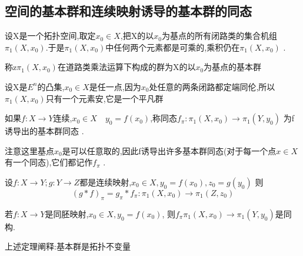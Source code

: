 \subsection*{空间的基本群和连续映射诱导的基本群的同态}
设X是一个拓扑空间,取定\(x_0 \in X \),把X的以\(x_0\)为基点的所有闭路类的集合机组\(\pi_1(X ,x_0)\).于是\(\pi_1(X,x_0)\)中任何两个元素都是可乘的,乘积仍在\(\pi_1(X,x_0)\) . 
\begin{definition}
    称z\(\pi_1(X,x_0)\)在道路类乘法运算下构成的群为X的以\(x_0\)为基点的基本群
\end{definition}
\begin{example}
    设X是\(E^n\)的凸集,\(x_0 \in X \)是任一点,因为\(x_0\)处任意的两条闭路都定端同伦,所以\(\pi_1(X,x_0)\)只有一个元素安,它是一个平凡群
\end{example}
\begin{definition}
    如果\(f: X \rightarrow Y \)连续,\(x_0 \in X  \quad y_0 =f(x_0)\),称同态\(f_{\pi} :  \pi_1(X,x_0) \rightarrow \pi_1(Y,y_0) \) 为f诱导出的基本群同态 .
\end{definition}
\begin{note}
    注意这里基点\(x_0\)是可以任意取的,因此f诱导出许多基本群同态(对于每一个点\(x \in X \)有一个同态),它们都记作\(f_{\pi}\) . 
\end{note}
\begin{corollary}
    设\(f: X \rightarrow Y  ; g: Y \rightarrow Z \)都是连续映射,\(x_0 \in X , y_0 = f(x_0) , z_0 = g(y_0)\) 则
    \[(g*f)_{\pi} = g_{\pi} * f_{\pi} : \pi_1(X,x_0) \rightarrow \pi_1 (Z,z_0)\]
\end{corollary}
\begin{theorem}
    若\(f: X \rightarrow Y\)是同胚映射,\(x_0 \in X , y_0 = f(x_0) \), 则\(f_{\pi} \pi_1 (X,x_0) \rightarrow \pi_1 (Y ,y_0)\)是同构. 
\end{theorem}
上述定理阐释:基本群是拓扑不变量
